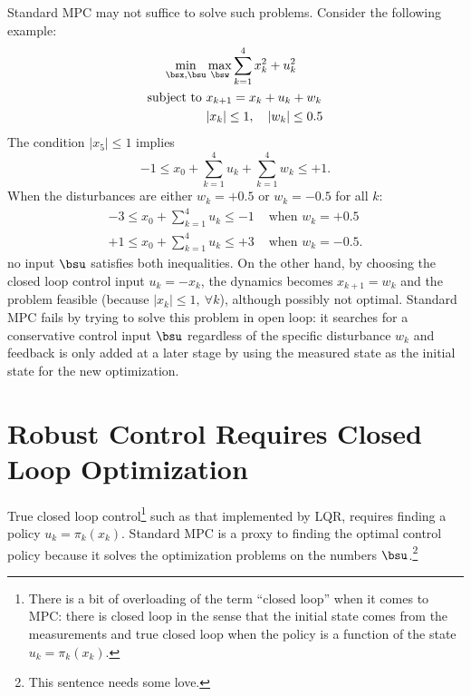 Standard MPC may not suffice to solve such problems. Consider the following example:
\begin{equation}
  \label{eq:rMPC-unfeasible-problem}
  \begin{aligned}
    \min_{\bsx,\bsu} & \max_{\bsw} \sum_{k=1}^{4} x_k^2+u_k^2 \\
    \text{subject to } & x_{k+1} = x_k + u_k + w_k \\
                     & |x_k| \le 1,\quad |w_k| \le 0.5
  \end{aligned}
\end{equation}
The condition $|x_5| \le 1$ implies
\begin{equation*}
  -1\le x_0 + \sum_{k=1}^4 u_k + \sum_{k=1}^4 w_k \le +1.
\end{equation*}
When the disturbances are either $w_k=+0.5$ or $w_k=-0.5$ for all $k$:
\begin{align*}
  -3 \le x_0 + \sum_{k=1}^4 u_k \le -1 & \text{ when } w_k=+0.5 \\
  +1 \le x_0 + \sum_{k=1}^4 u_k \le +3 & \text{ when } w_k=-0.5.
\end{align*}
no input $\bsu$ satisfies both inequalities. On the other hand, by choosing the closed loop control input $u_k = -x_k$, the dynamics becomes $x_{k+1}=w_k$ and the problem feasible (because $|x_k|\le 1,\ \forall k$), although possibly not optimal. Standard MPC fails by trying to solve this problem in open loop: it searches for a conservative control input $\bsu$ regardless of the specific disturbance $w_k$ and feedback is only added at a later stage by using the measured state as the initial state for the new optimization.

\section{Robust Control Requires Closed Loop Optimization}
\label{sec:closed-loop-robust-control}

True closed loop control\footnote{There is a bit of overloading of the term ``closed loop'' when it comes to MPC: there is closed loop in the sense that the initial state comes from the measurements and true closed loop when the policy is a function of the state $u_k = \pi_k(x_k)$.} such as that implemented by LQR, requires finding a policy $u_k=\pi_k(x_k)$. Standard MPC is a proxy to finding the optimal control policy because it solves the optimization problems on the numbers $\bsu$.\footnote{This sentence needs some love.}

